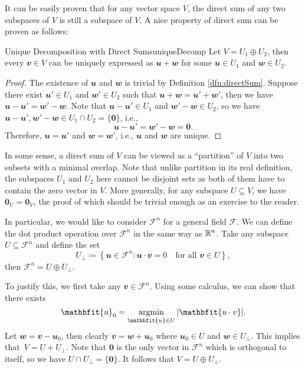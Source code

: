 \documentclass[math, code]{amznotes}
\theoremstyle{remark}
\newcommand{\zero}{\mathbf{0}}
\DeclareMathOperator*{\argmin}{argmin}
\begin{document}
It can be easily proven that for any vector space $V$, the direct sum of any two subspaces of $V$ is still a subspace of $V$. A nice property of direct sum can be proven as follows:
\begin{probox}{Unique Decomposition with Direct Sums}{uniqueDecomp}
    Let $V = U_1 \oplus U_2$, then every $\mathbfit{v} \in V$ can be uniquely expressed as $\mathbfit{u + w}$ for some $\mathbfit{u} \in U_1$ and $\mathbfit{w} \in U_2$.
    \tcblower
    \begin{proof}
        The existence of $\mathbfit{u}$ and $\mathbfit{w}$ is trivial by Definition \ref{dfn:directSum}. Suppose there exist $\mathbfit{u}' \in U_1$ and $\mathbfit{w}' \in U_2$ such that $\mathbfit{u + w} = \mathbfit{u}' + \mathbfit{w}'$, then we have $\mathbfit{u - u}' = \mathbfit{w}' - \mathbfit{w}$. Note that $\mathbfit{u - u}' \in U_1$ and $\mathbfit{w}' - \mathbfit{w} \in U_2$, so we have $\mathbfit{u - u}', \mathbfit{w}' - \mathbfit{w} \in U_1 \cap U_2 = \{\zero\}$, i.e.,
        \begin{equation*}
            \mathbfit{u - u}' = \mathbfit{w}' - \mathbfit{w} = \zero.
        \end{equation*} 
        Therefore, $\mathbfit{u} = \mathbfit{u}'$ and $\mathbfit{w} = \mathbfit{w}'$, i.e., $\mathbfit{u}$ and $\mathbfit{w}$ are unique.
    \end{proof}
\end{probox}
In some sense, a direct sum of $V$ can be viewed as a ``partition'' of $V$ into two subsets with a minimal overlap. Note that unlike partition in its real definition, the subspaces $U_1$ and $U_2$ here cannot be disjoint sets as both of them have to contain the zero vector in $V$. More generally, for any subspace $U \subseteq V$, we have $\zero_U = \zero_V$, the proof of which should be trivial enough as an exercise to the reader.

In particular, we would like to consider $\mathcal{F}^n$ for a general field $\mathcal{F}$. We can define the dot product operation over $\mathcal{F}^n$ in the same way as $\mathbb{R}^n$. Take any subspace $U \subseteq \mathcal{F}^n$ and define the set
\begin{equation*}
    U_{\perp} \coloneqq \left\{\mathbfit{u} \in \mathcal{F}^n \colon \mathbfit{u \cdot v} = 0 \quad\textrm{for all } \mathbfit{v} \in U\right\},
\end{equation*}
then $\mathcal{F}^n = U \oplus U_{\perp}$.

To justify this, we first take any $\mathbfit{v} \in \mathcal{F}^n$. Using some calculus, we can show that there exists 
\begin{equation*}
    \mathbfit{u}_0 = \argmin_{\mathbfit{u} \in U}\abs{\mathbfit{u \cdot v}}.
\end{equation*}
Let $\mathbfit{w = v - u}_0$, then clearly $\mathbfit{v = w + u}_0$ where $\mathbfit{u}_0 \in U$ and $\mathbfit{w} \in U_{\perp}$. This implies that~$V = U + U_{\perp}$. Note that $\zero$ is the only vector in $\mathcal{F}^n$ which is orthogonal to itself, so we have $U \cap U_{\perp} = \{\zero\}$. It follows that $V = U \oplus U_{\perp}$.
\end{document}
